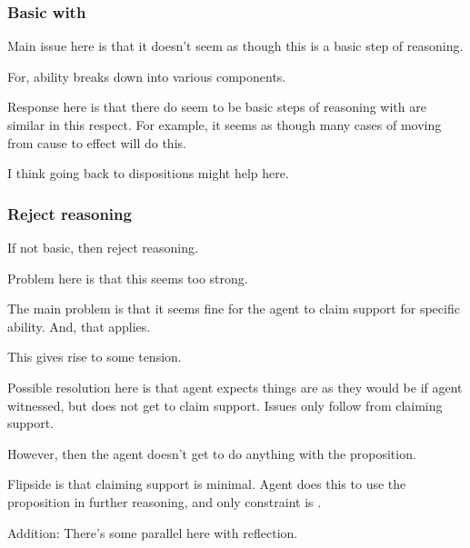 \subsubsection{\AR{} Basic with \adB{}}
\label{sec:ar-basic-with}

\begin{note}
  Main issue here is that it doesn't seem as though this is a basic step of reasoning.

  For, ability breaks down into various components.

  Response here is that there do seem to be basic steps of reasoning with are similar in this respect.
  For example, it seems as though many cases of moving from cause to effect will do this.

  I think going back to dispositions might help here.
  
\end{note}

\subsubsection{Reject reasoning}
\label{sec:reject-reasoning}

\begin{note}
  If not basic, then reject reasoning.
\end{note}

\begin{note}
  Problem here is that this seems too strong.
\end{note}

\begin{note}
  The main problem is that it seems fine for the agent to claim support for specific ability.
  And, that  applies.

  This gives rise to some tension.

  Possible resolution here is that agent expects things are as they would be if agent witnessed, but does not get to claim support.
  Issues only follow from claiming support.

  However, then the agent doesn't get to do anything with the proposition.

  Flipside is that claiming support is minimal.
  Agent does this to use the proposition in further reasoning, and only constraint is \eiS{}.
\end{note}

\begin{note}
  Addition:
  There's some parallel here with reflection.
\end{note}

